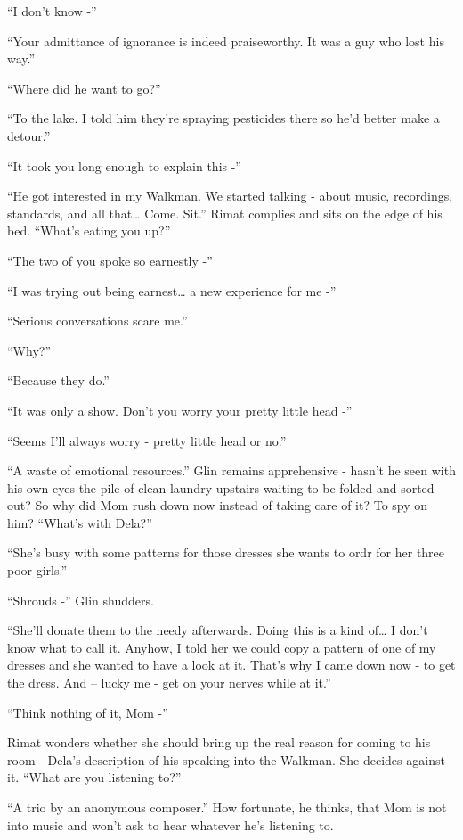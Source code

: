 \documentclass[twoside,11pt]{book}
\begin{document}
``I don't know -''

``Your admittance of ignorance is indeed praiseworthy. It was a guy who lost his way.''

``Where did he want to go?''

``To the lake. I told him they're spraying pesticides there so he'd better make a detour.''

``It took you long enough to explain this -''

``He got interested in my Walkman. We started talking - about music, recordings, standards, and all
that{\dots} Come. Sit.'' Rimat complies and sits on the edge of his bed.  ``What's eating you
up?''

``The two of you spoke so earnestly -''

``I was trying out being earnest{\dots} a new experience for me -''

``Serious conversations scare me.''

``Why?''

``Because they do.''

``It was only a show. Don't you worry your pretty little head -''

``Seems I'll always worry - pretty little head or no.''

``A waste of emotional resources.'' Glin remains apprehensive - hasn't he seen with his own
eyes the pile of clean laundry upstairs waiting to be folded and sorted out? So why did Mom rush down now instead of
taking care of it? To spy on him? ``What's with Dela?''

``She's busy with some patterns for those dresses she wants to ordr for her three poor
girls.''

``Shrouds -'' Glin shudders.

``She'll donate them to the needy afterwards. Doing this is a kind of{\dots} I don't know what to call it.
Anyhow, I told her we could copy a pattern of one of my dresses and she wanted to have a look at it. That's why I came
down now - to get the dress.  And -- lucky me - get on your nerves while at it.''

``Think nothing of it, Mom -''

Rimat wonders whether she should bring up the real reason for coming to his room -   Dela's description of his speaking
into the Walkman. She decides against it. ``What are you listening to?''

``A trio by an anonymous composer.'' How fortunate, he thinks, that Mom is not into music and
won't ask to hear whatever he's listening to.
\end{document}
